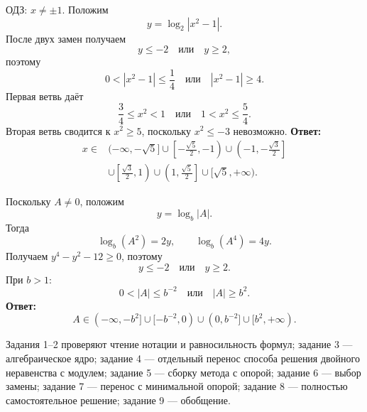 \begin{teacheranswer}[Задание 8]
  ОДЗ: \(x\ne\pm1\). Положим
  \[
    y=\log_2|x^2-1|.
  \]
  После двух замен получаем
  \[
    y\le-2\quad\text{или}\quad y\ge2,
  \]
  поэтому
  \[
    0<|x^2-1|\le\frac14
    \quad\text{или}\quad
    |x^2-1|\ge4.
  \]
  Первая ветвь даёт
  \[
    \frac34\le x^2<1
    \quad\text{или}\quad
    1<x^2\le\frac54.
  \]
  Вторая ветвь сводится к \(x^2\ge5\), поскольку \(x^2\le-3\) невозможно.
  \textbf{Ответ:}
  \[
    \begin{aligned}
      x\in{}&(-\infty,-\sqrt5]
      \cup\left[-\frac{\sqrt5}{2},-1\right)
      \cup\left(-1,-\frac{\sqrt3}{2}\right]\\
      &\cup\left[\frac{\sqrt3}{2},1\right)
      \cup\left(1,\frac{\sqrt5}{2}\right]
      \cup[\sqrt5,+\infty).
    \end{aligned}
  \]
\end{teacheranswer}

\begin{teacheranswer}[Задание 9]
  Поскольку \(A\ne0\), положим
  \[
    y=\log_b|A|.
  \]
  Тогда
  \[
    \log_b(A^2)=2y,
    \qquad
    \log_b(A^4)=4y.
  \]
  Получаем \(y^4-y^2-12\ge0\), поэтому
  \[
    y\le-2\quad\text{или}\quad y\ge2.
  \]
  При \(b>1\):
  \[
    0<|A|\le b^{-2}
    \quad\text{или}\quad
    |A|\ge b^2.
  \]
  \textbf{Ответ:}
  \[
    A\in(-\infty,-b^2]
    \cup[-b^{-2},0)
    \cup(0,b^{-2}]
    \cup[b^2,+\infty).
  \]
\end{teacheranswer}

\begin{criterionbox}
  Задания 1--2 проверяют чтение нотации и равносильность формул; задание 3 ---
  алгебраическое ядро; задание 4 --- отдельный перенос способа решения
  двойного неравенства с модулем; задание 5 --- сборку метода с опорой;
  задание 6 --- выбор замены; задание 7 --- перенос с минимальной опорой;
  задание 8 --- полностью самостоятельное решение; задание 9 --- обобщение.
\end{criterionbox}
